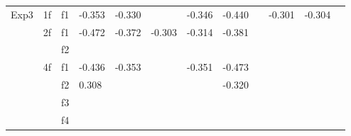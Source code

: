 \begin{table}[t]
\begin{tabularx}{\textwidth}{
>{\raggedright\arraybackslash}p{0.72cm}
>{\centering\arraybackslash}p{0.62cm}
>{\centering\arraybackslash}p{0.62cm}
*{9}{Y}
}
\midrule
Exp3 & 1f & f1 & -0.353 & -0.330 &  & -0.346 & -0.440 &  & -0.301 & -0.304 &  \\
 & 2f & f1 & -0.472 & -0.372 & -0.303 & -0.314 & -0.381 &  &  &  &  \\
 &  & f2 &  &  &  &  &  &  &  &  &  \\
 & 4f & f1 & -0.436 & -0.353 &  & -0.351 & -0.473 &  &  &  &  \\
 &  & f2 & 0.308 &  &  &  & -0.320 &  &  &  &  \\
 &  & f3 &  &  &  &  &  &  &  &  &  \\
 &  & f4 &  &  &  &  &  &  &  &  &  \\
\bottomrule
\end{tabularx}
\end{table}
